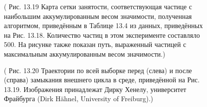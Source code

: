 \documentclass[10pt,a4paper]{article}
\begin{document}
\begin{figure}[H]
	\caption{ ( Рис. 13.19 Карта сетки занятости, соответствующая частице с наибольшим аккумулированным весом значимости, полученная алгоритмом, приведённым в Таблице 13.4 из данных, приведённых на Рис. 13.18. Количество частиц в этом эксперименте составляло 500. На рисунке также показан путь, выраженный частицей с максимальным аккумулированным весом значимости.) }
	\label{fig:1319orig}
\end{figure}

\begin{figure}[H]
	\caption{ ( Рис. 13.20 Траектории по всей выборке перед (слева) и после (справа) замыкания внешнего цикла в среде, приведённой на Рис. 13.19. Изображения принадлежат Дирку Хенелу, университет Фрайбурга (Dirk Hähnel, University of Freiburg).) }
	\label{fig:1320orig}
\end{figure}
\end{document}
